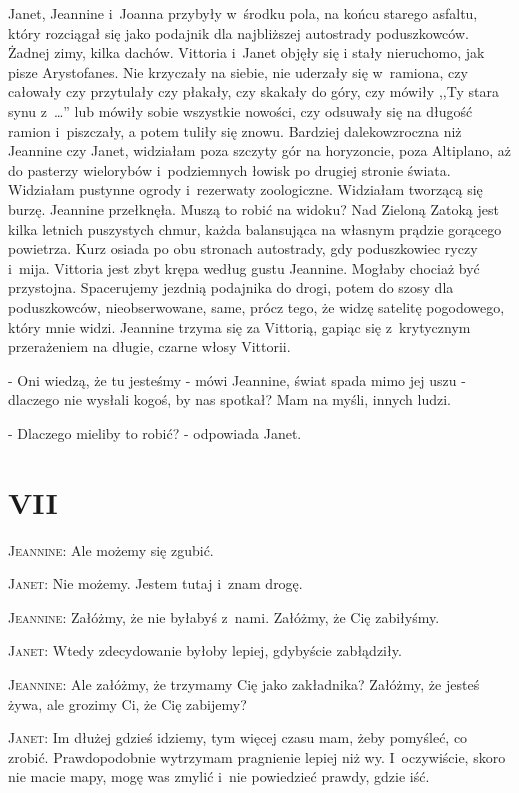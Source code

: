 \documentclass[oneside,polish,12pt,sfheadings]{mwbk}
\begin{document}
Janet, Jeannine i~Joanna przybyły w~środku pola, na końcu starego
asfaltu, który rozciągał się jako podajnik dla najbliższej autostrady
poduszkowców. Żadnej zimy, kilka dachów. Vittoria i~Janet objęły się
i stały nieruchomo, jak pisze Arystofanes. Nie krzyczały na siebie,
nie uderzały się w~ramiona, czy całowały czy przytulały czy płakały,
czy skakały do góry, czy mówiły ,,Ty stara synu z~\ldots'' lub mówiły
sobie wszystkie nowości, czy odsuwały się na długość ramion i~piszczały,
a potem tuliły się znowu. Bardziej dalekowzroczna niż Jeannine czy
Janet, widziałam poza szczyty gór na horyzoncie, poza Altiplano, aż
do pasterzy wielorybów i~podziemnych łowisk po drugiej stronie świata.
Widziałam pustynne ogrody i~rezerwaty zoologiczne. Widziałam tworzącą
się burzę. Jeannine przełknęła. Muszą to robić na widoku? Nad Zieloną
Zatoką jest kilka letnich puszystych chmur, każda balansująca na własnym
prądzie gorącego powietrza. Kurz osiada po obu stronach autostrady,
gdy poduszkowiec ryczy i~mija. Vittoria jest zbyt krępa według gustu
Jeannine. Mogłaby chociaż być przystojna. Spacerujemy jezdnią podajnika
do drogi, potem do szosy dla poduszkowców, nieobserwowane, same, prócz
tego, że widzę satelitę pogodowego, który mnie widzi. Jeannine trzyma
się za Vittorią, gapiąc się z~krytycznym przerażeniem na długie, czarne
włosy Vittorii.

- Oni wiedzą, że tu jesteśmy - mówi Jeannine, świat spada mimo jej
uszu - dlaczego nie wysłali kogoś, by nas spotkał? Mam na myśli, innych
ludzi.

- Dlaczego mieliby to robić? - odpowiada Janet.

\chapter{VII}

\textsc{Jeannine}: Ale możemy się zgubić.

\textsc{Janet}: Nie możemy. Jestem tutaj i~znam drogę.

\textsc{Jeannine}: Załóżmy, że nie byłabyś z~nami. Załóżmy, że Cię zabiłyśmy.

\textsc{Janet}: Wtedy zdecydowanie byłoby lepiej, gdybyście zabłądziły.

\textsc{Jeannine}: Ale załóżmy, że trzymamy Cię jako zakładnika? Załóżmy, że
jesteś żywa, ale grozimy Ci, że Cię zabijemy?

\textsc{Janet}: Im dłużej gdzieś idziemy, tym więcej czasu mam, żeby pomyśleć,
co zrobić. Prawdopodobnie wytrzymam pragnienie lepiej niż wy. I~oczywiście,
skoro nie macie mapy, mogę was zmylić i~nie powiedzieć prawdy, gdzie
iść.
\end{document}
